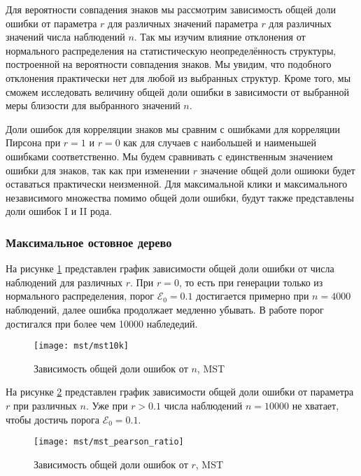 Для вероятности совпадения знаков мы рассмотрим зависимость  общей доли ошибки от параметра $r$ для различных значений параметра $r$ для различных значений числа наблюдений $n$. Так мы изучим влияние отклонения от нормального распределения на статистическую неопределённость структуры, построенной на вероятности совпадения знаков. Мы увидим, что подобного отклонения практически нет для любой из выбранных структур. Кроме того, мы сможем исследовать величину общей доли ошибки в зависимости от выбранной меры близости для выбранного значений $n$.

Доли ошибок для корреляции знаков мы сравним с ошибками для корреляции Пирсона при $r=1$ и $r=0$ как для случаев с наибольшей и наименьшей ошибками соответственно. Мы будем сравнивать с единственным значением ошибки для знаков, так как при изменении $r$ значение общей доли ошиюки будет оставаться практически неизменной. Для максимальной клики и максимального независимого множества помимо общей доли ошибки, будут также представлены доли ошибок I и II рода.

\subsubsection{Максимальное остовное дерево}

На рисунке \ref{fig:exp/mst/10k} представлен график зависимости общей доли ошибки от числа наблюдений для различных $r$. При $r=0$, то есть при генерации только из нормального распределения, порог $\mathcal{E}_0=0.1$ достигается примерно при $n=4000$ наблюдений, далее ошибка продолжает медленно убывать. В работе \cite{measures} порог достигался при более чем 10000 набледедий.

\begin{figure}[H]
\centering
\texttt{[image: mst/mst10k]}
\caption{Зависимость общей доли ошибок от $n$, MST}
\label{fig:exp/mst/10k}
\end{figure}

На рисунке \ref{fig:exp/mst/pearson_ratio} представлен график зависимости общей доли ошибки от параметра $r$ при различных $n$. Уже при $r>0.1$ числа наблюдений $n=10000$ не хватает, чтобы достичь порога $\mathcal{E}_0=0.1$. 

\begin{figure}[H]
\centering
\texttt{[image: mst/mst\_pearson\_ratio]}
\caption{Зависимость общей доли ошибок от $r$, MST}
\label{fig:exp/mst/pearson_ratio}
\end{figure}

